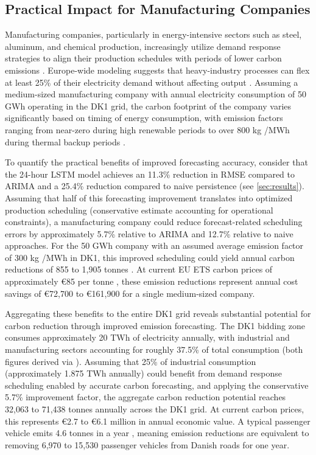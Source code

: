 \subsection{Practical Impact for Manufacturing Companies}
\label{subsec:practical-impact-for-manufacturing-companies}

Manufacturing companies, particularly in energy-intensive sectors such as steel, aluminum, and chemical production, increasingly utilize demand response strategies to align their production schedules with periods of lower carbon emissions \parencite{futurebridge}. Europe-wide modeling suggests that heavy-industry processes can flex at least 25\% of their electricity demand without affecting output \parencite{gils2014}. Assuming a medium-sized manufacturing company with annual electricity consumption of 50 GWh operating in the DK1 grid, the carbon footprint of the company varies significantly based on timing of energy consumption, with emission factors ranging from near-zero during high renewable periods to over 800 kg \cotwoe{}/MWh during thermal backup periods \parencite{energidataservice2025}.

To quantify the practical benefits of improved forecasting accuracy, consider that the 24-hour LSTM model achieves an 11.3\% reduction in RMSE compared to ARIMA and a 25.4\% reduction compared to naive persistence (see \autoref{sec:results}). Assuming that half of this forecasting improvement translates into optimized production scheduling (conservative estimate accounting for operational constraints), a manufacturing company could reduce forecast-related scheduling errors by approximately 5.7\% relative to ARIMA and 12.7\% relative to naive approaches. For the 50 GWh company with an assumed average emission factor of 300 kg \cotwoe{}/MWh in DK1, this improved scheduling could yield annual carbon reductions of 855 to 1,905 tonnes \cotwoe{}. At current EU ETS carbon prices of approximately \euro85 per tonne \cotwoe{} \parencite{abnett2022,europeancommission2023}, these emission reductions represent annual cost savings of \euro72,700 to \euro161,900 for a single medium-sized company.

Aggregating these benefits to the entire DK1 grid reveals substantial potential for carbon reduction through improved emission forecasting. The DK1 bidding zone consumes approximately 20 TWh of electricity annually, with industrial and manufacturing sectors accounting for roughly 37.5\% of total consumption (both figures derived via \textcite{energidataservice2025}). Assuming that 25\% of industrial consumption (approximately 1.875 TWh annually) could benefit from demand response scheduling enabled by accurate carbon forecasting, and applying the conservative 5.7\% improvement factor, the aggregate carbon reduction potential reaches 32,063 to 71,438 tonnes \cotwoe{} annually across the DK1 grid. At current carbon prices, this represents \euro2.7 to \euro6.1 million in annual economic value. A typical passenger vehicle emits 4.6 tonnes \cotwo{} in a year \parencite{usepa2023}, meaning emission reductions are equivalent to removing 6,970 to 15,530 passenger vehicles from Danish roads for one year.

